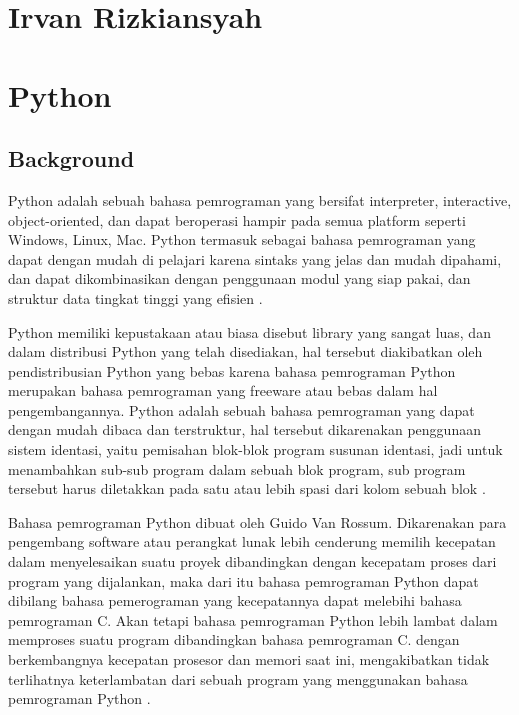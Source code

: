 \section{Irvan Rizkiansyah}

\section{Python}
	\subsection{Background}
	\label{Background}
	\par
	Python adalah sebuah bahasa pemrograman yang bersifat interpreter, interactive, object-oriented, dan dapat beroperasi hampir pada semua platform seperti Windows, Linux, Mac. Python termasuk sebagai bahasa pemrograman yang dapat dengan mudah di pelajari karena sintaks yang jelas dan mudah dipahami, dan dapat dikombinasikan dengan penggunaan modul yang siap pakai, dan struktur data tingkat tinggi yang efisien \cite{prasetya2012deteksi}.
	\par
	Python memiliki kepustakaan atau biasa disebut library yang sangat luas, dan dalam distribusi Python yang telah disediakan, hal tersebut diakibatkan oleh pendistribusian Python yang bebas karena bahasa pemrograman Python merupakan bahasa pemrograman yang freeware atau bebas dalam hal pengembangannya. Python adalah sebuah bahasa pemrograman yang dapat dengan mudah dibaca dan terstruktur, hal tersebut dikarenakan penggunaan sistem identasi, yaitu pemisahan blok-blok program susunan identasi, jadi untuk menambahkan sub-sub program dalam sebuah blok program, sub program tersebut harus diletakkan pada satu atau lebih spasi dari kolom sebuah blok \cite{perkasa2014rancang}.
	\par
	Bahasa pemrograman Python dibuat oleh Guido Van Rossum. Dikarenakan para pengembang software atau perangkat lunak lebih cenderung memilih kecepatan dalam menyelesaikan suatu proyek dibandingkan dengan kecepatam proses dari program yang dijalankan, maka dari itu bahasa pemrograman Python dapat dibilang bahasa pemerograman yang kecepatannya dapat melebihi bahasa pemrograman C. Akan tetapi bahasa pemrograman Python lebih lambat dalam memproses suatu program dibandingkan bahasa pemrograman C. dengan berkembangnya kecepatan prosesor dan memori saat ini, mengakibatkan tidak terlihatnya keterlambatan dari sebuah program yang menggunakan bahasa pemrograman Python \cite{miftakhuddinimplementasi}.

